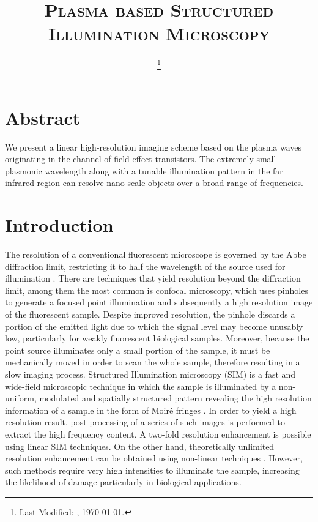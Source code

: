 \documentclass[11pt]{article}
\begin{document}
\title{\textsc{Plasma based Structured Illumination Microscopy}\\}
\date{\footnote{Last Modified: \currenttime, \today.}}
\maketitle


\section{Abstract}
%
﻿We present a linear high-resolution imaging scheme based on the plasma waves originating in the channel of field-effect transistors. The extremely small plasmonic wavelength along with a tunable illumination pattern in the far infrared region can resolve nano-scale objects over a broad range of frequencies.
%
\section{Introduction}
%
The resolution of a conventional fluorescent microscope is governed by the Abbe diffraction limit, restricting it to half the wavelength of the source used for illumination \cite{0521639212}. There are techniques that yield resolution beyond the diffraction limit, among them the most common is confocal microscopy, which uses pinholes to generate a focused point illumination and subsequently a high resolution image of the fluorescent sample. Despite improved resolution, the pinhole discards a portion of the emitted light due to which the signal level may become unusably low, particularly for weakly fluorescent biological samples. Moreover, because the point source illuminates only a small portion of the sample, it must be mechanically moved in order to scan the whole sample, therefore resulting in a slow imaging process. Structured Illumination microscopy (SIM) is a fast and wide-field microscopic technique in which the sample is illuminated by a non-uniform, modulated and spatially structured pattern revealing the high resolution information of a sample in the form of Moiré fringes \cite{Gustafsson_2000,Heintzmann1999a}. In order to yield a high resolution result, post-processing of a series of such images is performed to extract the high frequency content. A two-fold resolution enhancement is possible using linear SIM techniques. On the other hand, theoretically unlimited resolution enhancement can be obtained using non-linear techniques \cite{Gustafsson_2005}. However, such methods require very high intensities to illuminate the sample, increasing the likelihood of damage particularly in biological applications.
\end{document}
